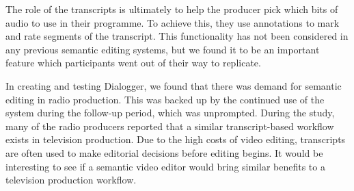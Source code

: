 The role of the transcripts is ultimately to help the producer pick which bits
of audio to use in their programme. To achieve this, they use annotations to
mark and rate segments of the transcript. This functionality has not been
considered in any previous semantic editing systems, but we found it to be an
important feature which participants went out of their way to replicate.

In creating and testing Dialogger, we found that there was demand for semantic
editing in radio production. This was backed up by the continued use of the
system during the follow-up period, which was unprompted.
During the study, many of the radio producers reported that a similar
transcript-based workflow exists in television production. Due to the high
costs of video editing, transcripts are often used to make editorial decisions
before editing begins. It would be interesting to see if a semantic video
editor would bring similar benefits to a television production workflow.





















